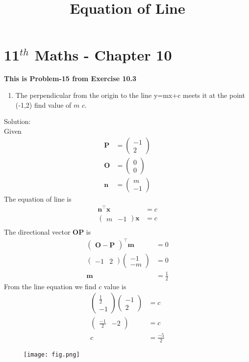 \documentclass[journel,12pt,twocolumn]{article}
\newcommand{\myvec}[1]{\ensuremath{\begin{pmatrix}#1\end{pmatrix}}}
\let\vec\mathbf
\begin{document}
\begin{center}
\title{\textbf{Equation of Line}}
\date{\vspace{-5ex}} %
\maketitle
\end{center}
\section{11$^{th}$ Maths - Chapter 10}
\textbf{This is Problem-15 from Exercise 10.3}
\begin{enumerate}
\item The perpendicular from the origin to the line y=mx+c meets it at the point (-1,2) find value of $m$ $c$.
\end{enumerate}
Solution:
\\
Given
\begin{align}
\vec{P}&=\myvec{-1\\2}\\
\vec{O}&=\myvec{0\\0}\\
\vec{n}&=\myvec{m\\-1}
\end{align}
The equation of line is
\begin{align}
\vec{n}^{\top}\vec{x}&=c\\
\myvec{m&-1}\vec{x}&=c\\
\end{align}
The directional vector $\vec{OP}$ is 
\begin{align}
\myvec{\vec{O}-\vec{P}}^{\top}\vec{m}&=0\\
\myvec{-1&2}\myvec{-1\\-m}&=0\\
\vec{m}&=\frac{1}{2}
\end{align}
From the line equation we find $c$ value is
\begin{align}
\myvec{\frac{1}{2}\\-1}\myvec{-1\\2}&=c\\
\myvec{\frac{-1}{2}&-2}&=c\\
c&=\frac{-5}{2}
\end{align}
\begin{figure}[!h]
\centering
\texttt{[image: fig.png]}
\caption{}
  \label{fig:Figure}
\end{figure}
\end{document}
